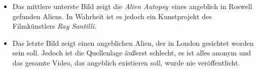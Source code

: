 \documentclass{scrartcl}
\begin{document}
\begin{itemize}
	\item Das mittlere unterste Bild zeigt die \frqq\textit{Alien Autopsy}\flqq\ eines angeblich in Roswell gefunden Aliens. In Wahrheit ist es jedoch ein Kunstprojekt des Filmkünstlers \textit{Ray Santilli}. 
	\item Das letzte Bild zeigt einen angeblichen Alien, der in London gesichtet worden sein soll. Jedoch ist die Quellenlage äußerst schlecht, es ist alles anonym und das gesamte \frqq Video\flqq, das angeblich existieren soll, wurde nie veröffentlicht. 
\end{itemize}
\end{document}
